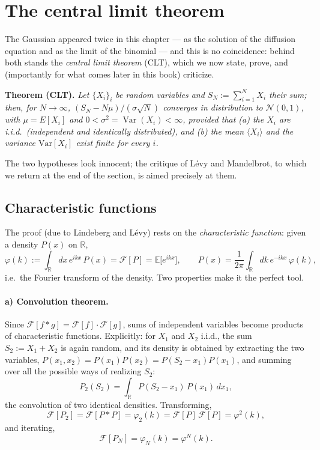 \section{The central limit theorem}

The Gaussian appeared twice in this chapter --- as the solution of the diffusion equation and as the limit of the binomial --- and this is no coincidence: behind both stands the \emph{central limit theorem} (CLT), which we now state, prove, and (importantly for what comes later in this book) criticize.

\medskip
\noindent\textbf{Theorem (CLT).}
\emph{Let $\{X_i\}_i$ be random variables and $S_N:=\sum_{i=1}^{N}X_i$ their sum; then, for $N\to\infty$, $(S_N-N\mu)/(\sigma\sqrt N)$ converges in distribution to $\mathcal N(0,1)$, with $\mu=E[X_i]$ and $0<\sigma^2=\operatorname{Var}(X_i)<\infty$, provided that (a) the $X_i$ are i.i.d.\ (independent and identically distributed), and (b) the mean $\langle X_i\rangle$ and the variance $\mathrm{Var}[X_i]$ exist finite for every $i$.}
\medskip

The two hypotheses look innocent; the critique of L\'evy and Mandelbrot, to which we return at the end of the section, is aimed precisely at them.

\subsection{Characteristic functions}

The proof (due to Lindeberg and L\'evy) rests on the \emph{characteristic function}: given a density $P(x)$ on $\mathbb{R}$,
\begin{equation}
\varphi(k) := \int_{\mathbb{R}} dx\, e^{ikx}\,P(x) = \mathcal{F}[P] = \mathbb{E}\bigl[e^{ikx}\bigr],
\qquad
P(x) = \frac{1}{2\pi}\int_{\mathbb{R}} dk\, e^{-ikx}\,\varphi(k),
\end{equation}
i.e.\ the Fourier transform of the density.
Two properties make it the perfect tool.

\paragraph{a) Convolution theorem.}
Since $\mathcal{F}[f*g]=\mathcal{F}[f]\cdot\mathcal{F}[g]$, sums of independent variables become products of characteristic functions.
Explicitly: for $X_1$ and $X_2$ i.i.d., the sum $S_2:=X_1+X_2$ is again random, and its density is obtained by extracting the two variables, $P(x_1,x_2)=P(x_1)P(x_2)=P(S_2-x_1)P(x_1)$, and summing over all the possible ways of realizing $S_2$:
\begin{equation}
P_2(S_2)=\int_{\mathbb{R}} P(S_2-x_1)\,P(x_1)\,dx_1,
\end{equation}
the convolution of two identical densities.
Transforming,
\begin{equation}
\mathcal{F}[P_2]=\mathcal{F}[P*P]=\varphi_2(k)=\mathcal{F}[P]\,\mathcal{F}[P]=\varphi^2(k),
\end{equation}
and iterating,
\begin{equation}
\mathcal{F}[P_N]=\varphi_N(k)=\varphi^N(k).
\end{equation}

